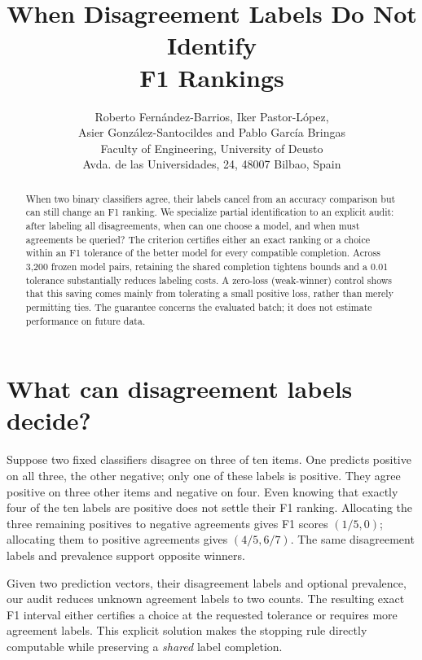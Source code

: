 \documentclass[a4paper]{esannV2}
\newcommand{\F}{F_1}
\begin{document}
\title{When Disagreement Labels Do Not Identify\protect\\F1 Rankings}
\author{Roberto Fern\'andez-Barrios, Iker Pastor-L\'opez,\\
Asier Gonz\'alez-Santocildes and Pablo Garc\'ia Bringas
\vspace{.3cm}\\
Faculty of Engineering, University of Deusto\\
Avda. de las Universidades, 24, 48007 Bilbao, Spain
}
\maketitle
\begin{abstract}
When two binary classifiers agree, their labels cancel from an accuracy
comparison but can still change an F1 ranking. We specialize partial
identification to an explicit audit: after labeling all disagreements,
when can one choose a model, and when must agreements be queried?
The criterion certifies either an exact ranking or a choice within an F1
tolerance of the better model for every compatible completion. Across 3,200
frozen model pairs, retaining the shared completion tightens bounds and a 0.01
tolerance substantially reduces labeling costs. A zero-loss (weak-winner) control shows that
this saving comes mainly from tolerating a small positive loss, rather than
merely permitting ties. The guarantee concerns the evaluated batch; it does not
estimate performance on future data.
\end{abstract}

\section{What can disagreement labels decide?}
Suppose two fixed classifiers disagree on three of ten items. One predicts
positive on all three, the other negative; only one of these labels is positive.
They agree positive on three other items and negative on four. Even knowing
that exactly four of the ten labels are positive does not settle their F1
ranking. Allocating the three remaining positives to negative agreements gives
F1 scores $(1/5,0)$; allocating them to positive agreements gives $(4/5,6/7)$.
The same disagreement labels and prevalence support opposite winners.

Given two prediction vectors, their disagreement labels and optional prevalence,
our audit reduces unknown agreement labels to two counts. The resulting exact
F1 interval either certifies a choice at the requested tolerance or requires
more agreement labels. This explicit solution makes the stopping rule directly
computable while preserving a \emph{shared} label completion.
\end{document}
